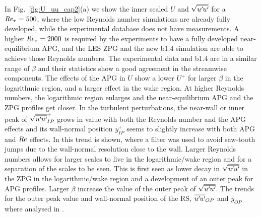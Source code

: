 In Fig.~\ref{fig:U_uu_cap2}(a) we show the inner scaled $U$ and $\sqrt{\overline{u^{\prime}\mkern-1.2mu u^{\prime}\mkern-1.2mu}}$ for a $\mbox{\textit{Re}}_{\tau}=500$, where the low Reynolds number simulations are already fully developed, while the experimental database does not have measurements. A higher $\mbox{\textit{Re}}_{\tau}=2000$ is required by the experiments to have a fully developed near-equilibrium APG, and the LES ZPG and the new b1.4 simulation are able to achieve those Reynolds numbers.
The experimental data and b1.4 are in a similar range of $\beta$ and their statistics show a good agreement in the streamwise components.
The effects of the APG in $U$ show a lower $U^+$ for larger $\beta$ in the logarithmic region, and a larger effect in the wake region. At higher Reynolds numbers, the logarithmic region enlarges and the near-equilibrium APG and the ZPG profiles get closer.
In the turbulent perturbations, the near-wall or inner peak of $\sqrt{\overline{u^{\prime}\mkern-1.2mu u^{\prime}\mkern-1.2mu}}^+_{IP}$ grows in value with both the Reynolds number and the APG effects and its wall-normal position $y_{IP}^+$ seems to slightly increase with both APG and $\mbox{\textit{Re}}$ effects. In \cite{Pozuelo_JFM_22} this trend is shown, where a filter was used to avoid saw-tooth jumps due to the wall-normal resolution close to the wall.
Larger Reynolds numbers allows for larger scales to live in the logarithmic/wake region and for a separation of the scales to be seen. This is first seen as lower decay in $\sqrt{\overline{u^{\prime}\mkern-1.2mu u^{\prime}\mkern-1.2mu}}$ in the ZPG in the logarithmic/wake region and a development of an outer peak for APG profiles. Larger $\beta$ increase the value of the outer peak of $\sqrt{\overline{u^{\prime}\mkern-1.2mu u^{\prime}\mkern-1.2mu}}$. The trends for the outer peak value and wall-normal position of the RS,  $\overline{u^{\prime}\mkern-1.2mu u^{\prime}\mkern-1.2mu}_{OP}$ and $y_{OP}$ where analysed in \cite{Pozuelo_JFM_22}. 


